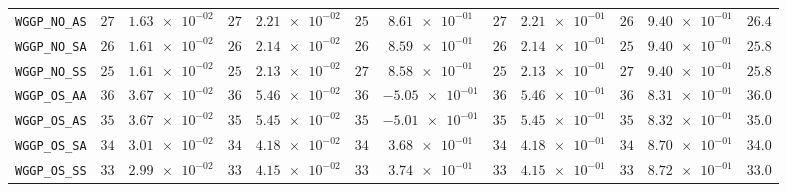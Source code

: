 \begin{xltabular}{\textwidth}{l||cC|cC|cC|cC|cC||c}
	\texttt{WGGP\_NO\_AS} & $ 27$ & $ \num{1.63e-02}$ & $ 27$ & $ \num{2.21e-02}$ & $ 25$ & $ \num{8.61e-01}$ & $ 27$ & $ \num{2.21e-01}$ & $ 26$ & $ \num{9.40e-01}$ & $ 26.4$  \\
	\texttt{WGGP\_NO\_SA} & $ 26$ & $ \num{1.61e-02}$ & $ 26$ & $ \num{2.14e-02}$ & $ 26$ & $ \num{8.59e-01}$ & $ 26$ & $ \num{2.14e-01}$ & $ 25$ & $ \num{9.40e-01}$ & $ 25.8$  \\
	\texttt{WGGP\_NO\_SS} & $ 25$ & $ \num{1.61e-02}$ & $ 25$ & $ \num{2.13e-02}$ & $ 27$ & $ \num{8.58e-01}$ & $ 25$ & $ \num{2.13e-01}$ & $ 27$ & $ \num{9.40e-01}$ & $ 25.8$  \\
	\texttt{WGGP\_OS\_AA} & $ 36$ & $ \num{3.67e-02}$ & $ 36$ & $ \num{5.46e-02}$ & $ 36$ & $ \num{-5.05e-01}$ & $ 36$ & $ \num{5.46e-01}$ & $ 36$ & $ \num{8.31e-01}$ & $ 36.0$  \\
	\texttt{WGGP\_OS\_AS} & $ 35$ & $ \num{3.67e-02}$ & $ 35$ & $ \num{5.45e-02}$ & $ 35$ & $ \num{-5.01e-01}$ & $ 35$ & $ \num{5.45e-01}$ & $ 35$ & $ \num{8.32e-01}$ & $ 35.0$  \\
	\texttt{WGGP\_OS\_SA} & $ 34$ & $ \num{3.01e-02}$ & $ 34$ & $ \num{4.18e-02}$ & $ 34$ & $ \num{3.68e-01}$ & $ 34$ & $ \num{4.18e-01}$ & $ 34$ & $ \num{8.70e-01}$ & $ 34.0$  \\
	\texttt{WGGP\_OS\_SS} & $ 33$ & $ \num{2.99e-02}$ & $ 33$ & $ \num{4.15e-02}$ & $ 33$ & $ \num{3.74e-01}$ & $ 33$ & $ \num{4.15e-01}$ & $ 33$ & $ \num{8.72e-01}$ & $ 33.0$  \\

\end{xltabular}
